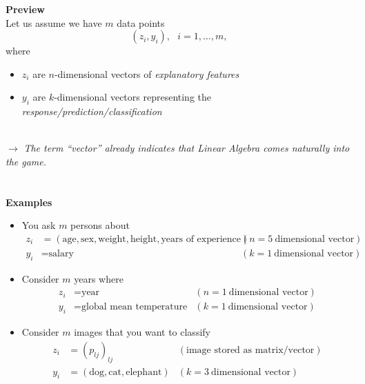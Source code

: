 %
\begin{frame}[c]
	\textbf{Preview}~\\
	\Vspace{0.25cm}
	Let us assume we have $m$ data points
	$$(z_i, y_i),~~~i=1,\ldots,m,$$
	where
	\begin{itemize}
		\item $z_i$ are $n$-dimensional vectors of \textit{explanatory features} 
		\item $y_i$ are $k$-dimensional vectors representing the \textit{response/prediction/classification}
	\end{itemize}
	~\\
	$\rightarrow$ \textit{The term \textit{``vector''} already indicates that Linear Algebra comes naturally into the game.}
	~\\~\\~\\
	\textbf{Examples}\\
	\begin{itemize}
		\item You ask $m$ persons about 
		\begin{align*}
		z_i &= (\text{age}, \text{sex},\text{weight},\text{height},\text{years of experience}) &(n=5 ~ \text{dimensional vector})\\
		y_i &= \text{salary} &(k=1 ~ \text{dimensional vector})
		\end{align*}
		\item Consider $m$ years where
		\begin{align*}
		z_i &= \text{year} &(n=1 ~ \text{dimensional vector})\\
		y_i &= \text{global mean temperature} &(k=1 ~ \text{dimensional vector})
		\end{align*}	
		\item Consider $m$ images that you want to classify 
		\begin{align*}
		z_i &=(p_{lj})_{lj} & (\text{image stored as matrix/vector})\\
		y_i &= (\text{dog}, \text{cat}, \text{elephant}) &(k=3 ~ \text{dimensional vector})
		\end{align*}
	\end{itemize}
	
\end{frame}

